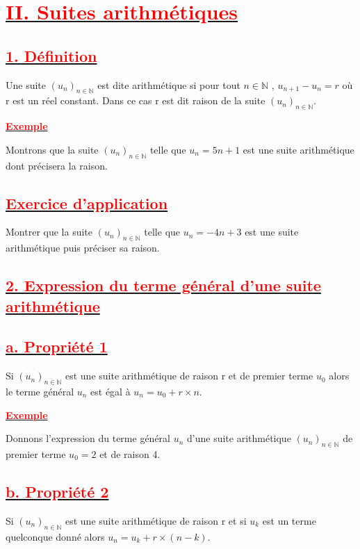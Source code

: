 \documentclass[12pt]{article}
\begin{document}
\section*{\underline{\textbf{\textcolor{red}{II. Suites arithmétiques}}}}
\subsection*{\underline{\textbf{\textcolor{red}{1. Définition}}}}
Une suite $(u_{n})_{n\in\mathbb{N}}$ est dite arithmétique si pour tout $n\in\mathbb{N}$ , $u_{n+1} - u_{n} = r$ où r est un réel constant. Dans ce cas r est dit raison de la suite $(u_{n})_{n\in\mathbb{N}}$.

\underline{\textbf{\textcolor{red}{Exemple}}}

Montrons que la suite $(u_{n})_{n\in\mathbb{N}}$ telle que $u_{n} = 5n + 1$ est une suite arithmétique dont précisera la raison.
\subsection*{\underline{\textbf{\textcolor{red}{Exercice d'application}}}}
Montrer que la suite $(u_{n})_{n\in\mathbb{N}}$ telle que $u_{n} = -4n + 3$ est une suite arithmétique puis
préciser sa raison.
\subsection*{\underline{\textbf{\textcolor{red}{2. Expression du terme général d’une suite arithmétique}}}}
\subsection*{\underline{\textbf{\textcolor{red}{a. Propriété 1}}}}
Si $(u_{n})_{n\in\mathbb{N}}$ est une suite arithmétique de raison r et de premier terme $u_{0}$ alors le terme général $u_{n}$ est égal à $u_{n} = u_{0} + r × n.$

\underline{\textbf{\textcolor{red}{Exemple}}}

Donnons l’expression du terme général $u_{n}$ d’une suite arithmétique $(u_{n})_{n\in\mathbb{N}}$ de premier terme $u_{0} = 2$ et de raison 4.

\subsection*{\underline{\textbf{\textcolor{red}{b. Propriété 2}}}}
Si $(u_{n})_{n\in\mathbb{N}}$ est une suite arithmétique de raison r et si $u_{k}$ est un terme quelconque donné alors $u_{n} = u_{k} +r × (n - k)$.
\end{document}
